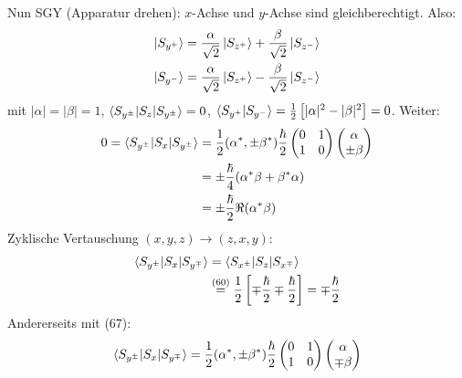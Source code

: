 \documentclass[a4paper]{scrartcl}
\begin{document}
{\begin{aaufz}
Nun SGY (Apparatur drehen): $x$-Achse und $y$-Achse sind gleichberechtigt. Also:
\begin{align}
\begin{split}
\ket{S_{y	^+}} & = \frac \alpha {\sqrt2} \ket{ S_{z^+}} + \frac \beta {\sqrt2} \ket{ S_{z^-}} \\
\ket{S_{y^-}} & = \frac \alpha {\sqrt2} \ket{ S_{z^+}} - \frac \beta {\sqrt2} \ket{ S_{z^-}}
\end{split}
\end{align}
mit $\vert \alpha \vert = \vert \beta \vert = 1$, $\braket{ S_{y^\pm} | S_z | S_{y^\pm}} = 0$, $\braket{ S_{y^+} | S_{y^-}} = \frac12 \left[ \vert \alpha \vert^2 - \vert \beta \vert^2 \right] = 0$. Weiter:
\begin{align}
\begin{split}
0=\braket{   S_{y^\pm} | S_x | S_{y^\pm}} & =
\frac12 (\alpha^*, \pm \beta^*) \frac \hbar 2 \begin{pmatrix} 0 & 1 \\ 1 & 0 \end{pmatrix} \begin{pmatrix} \alpha \\ \pm \beta \end{pmatrix} \\
& = \pm \frac \hbar 4 (\alpha^* \beta + \beta^* \alpha) \\
& = \pm \frac \hbar 2 \Re (\alpha^* \beta)
\end{split}
\end{align}
Zyklische Vertauschung $(x,y,z) \rightarrow (z,x,y)$:
\begin{align}
\begin{split}
\braket{ S_{y^\pm} | S_x | S_{y^\mp}} & = \braket{ S_{x^\pm} | S_z | S_{x^\mp}} \\
& \stackrel{(60)}= \frac12 \left[ \mp \frac \hbar 2 \mp \frac \hbar 2 \right] = \mp \frac \hbar 2
\end{split}
\end{align}
Andererseits mit (67):
\begin{align}
\begin{split}
\braket{ S_{y^\pm} | S_x | S_{y^\mp}} & = \frac12 (\alpha^*, \pm \beta^*) \frac \hbar 2 \begin{pmatrix} 0 & 1 \\ 1 & 0 \end{pmatrix} \begin{pmatrix} \alpha \\ \mp \beta \end{pmatrix} \\

\end{split}
\end{align}
\end{aaufz}}
\end{document}

